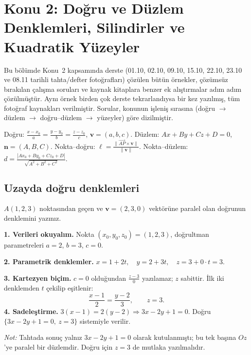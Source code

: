 \section{Konu 2: Doğru ve Düzlem Denklemleri, Silindirler ve Kuadratik Yüzeyler}

Bu bölümde Konu~2 kapsamında derste (01.10, 02.10, 09.10, 15.10, 22.10, 23.10 ve 08.11 tarihli tahta/defter fotoğrafları) çözülen bütün örnekler, çözümsüz bırakılan çalışma soruları ve kaynak kitaplara benzer ek alıştırmalar adım adım çözülmüştür. Aynı örnek birden çok derste tekrarlandıysa bir kez yazılmış, tüm fotoğraf kaynakları verilmiştir. Sorular, konunun işleniş sırasına (doğru $\to$ düzlem $\to$ doğru--düzlem $\to$ yüzeyler) göre dizilmiştir.

\begin{bilgi}
Doğru: $\frac{x-x_0}{a}=\frac{y-y_0}{b}=\frac{z-z_0}{c}$, $\mathbf v=(a,b,c)$.\quad
Düzlem: $Ax+By+Cz+D=0$, $\mathbf n=(A,B,C)$.\quad
Nokta--doğru: $\ell=\frac{\|\overrightarrow{AP}\times\mathbf v\|}{\|\mathbf v\|}$.\quad
Nokta--düzlem: $d=\frac{|Ax_0+By_0+Cz_0+D|}{\sqrt{A^2+B^2+C^2}}$.
\end{bilgi}

\subsection{Uzayda doğru denklemleri}

\begin{soru}
$A(1,2,3)$ noktasından geçen ve $\mathbf v=(2,3,0)$ vektörüne paralel olan doğrunun denklemini yazınız.
\end{soru}
\begin{cevap}
\textbf{1. Verileri okuyalım.} Nokta $(x_0,y_0,z_0)=(1,2,3)$, doğrultman parametreleri $a=2$, $b=3$, $c=0$.

\textbf{2. Parametrik denklemler.} $x=1+2t,\quad y=2+3t,\quad z=3+0\cdot t=3$.

\textbf{3. Kartezyen biçim.} $c=0$ olduğundan $\frac{z-3}{0}$ yazılamaz; $z$ sabittir. İlk iki denklemden $t$ çekilip eşitlenir:
\[ \boxed{\frac{x-1}{2}=\frac{y-2}{3},\qquad z=3}. \]
\textbf{4. Sadeleştirme.} $3(x-1)=2(y-2)\Rightarrow3x-2y+1=0$. Doğru $\{3x-2y+1=0,\ z=3\}$ sistemiyle verilir.

\textit{Not:} Tahtada sonuç yalnız $3x-2y+1=0$ olarak kutulanmıştı; bu tek başına $Oz$'ye paralel bir düzlemdir. Doğru için $z=3$ de mutlaka yazılmalıdır.
\end{cevap}


